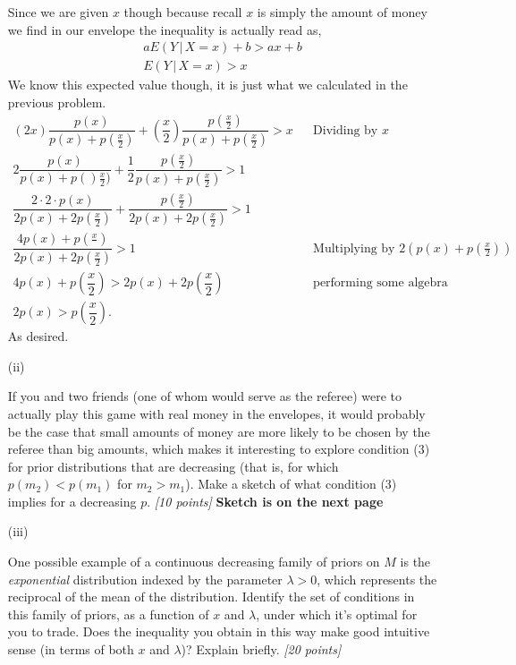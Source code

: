 \documentclass[12pt]{article}
\newcommand{\given}{\, | \,}
\begin{document}
\begin{itemize}
Since we are given $x$ though because recall $x$ is simply the amount of money we find in our envelope the inequality is actually read as,
\begin{align*}
    aE(Y\given X = x) + b > a x + b \\
    E(Y\given X = x) > x
\end{align*}
We know this expected value though, it is just what we calculated in the previous problem.
\begin{align*}
    (2x)\dfrac{p(x)}{p(x) + p(\frac{x}{2})} + (\dfrac{x}{2})\dfrac{ p \! \left( \frac{ x }{ 2 } \right) }{ p( x ) + p \! \left( \frac{ x }{ 2 } \right) } > x && \text{Dividing by $x$} \\
    2\dfrac{p(x)}{p(x)+ p()\frac{x}{2})} + \dfrac{1}{2}\dfrac{p(\frac{x}{2})}{p(x)+p(\frac{x}{2})} > 1 \\
    \dfrac{2\cdot2\cdot p(x)}{2p(x) + 2p(\frac{x}{2}) } + \dfrac{p(\frac{x}{2})}{2p(x)+2p(\frac{x}{2})} > 1 \\
    \dfrac{4p(x) + p(\frac{x}{})}{2p(x)+ 2p(\frac{x}{2})} > 1 && \text{Multiplying by $2(p(x)+p(\frac{x}{2}))$} \\
    4p(x) + p(\dfrac{x}{2}) > 2p(x) + 2p(\dfrac{x}{2}) && \text{performing some algebra} \\
    2p(x) > p(\dfrac{x}{2}).
\end{align*}As desired. 

\item[(ii)]%

If you and two friends (one of whom would serve as the referee) were to
actually play this game with real money in the envelopes, it would
probably be the case that small amounts of money are more likely to be
chosen by the referee than big amounts, which makes it interesting to
explore condition (3) for prior distributions that are decreasing (that
is, for which $p ( m_2 ) < p ( m_1 )$ for $m_2 > m_1$). Make a sketch of
what condition (3) implies for a decreasing $p$. \textit{[10 points]}
\textbf{Sketch is on the next page}
\newpage

\item[(iii)]%

One possible example of a
continuous decreasing family of priors on $M$ is the \textit{exponential}
distribution indexed by the parameter $\lambda > 0$,
which represents the reciprocal of the mean of the distribution. Identify the set of
conditions in this family of priors, as a function of $x$ and $\lambda$,
under which it's optimal for you to trade. Does the inequality you obtain
in this way make good intuitive sense (in terms of both $x$ and
$\lambda$)? Explain briefly. \textit{[20 points]}


\end{itemize}
\end{document}

